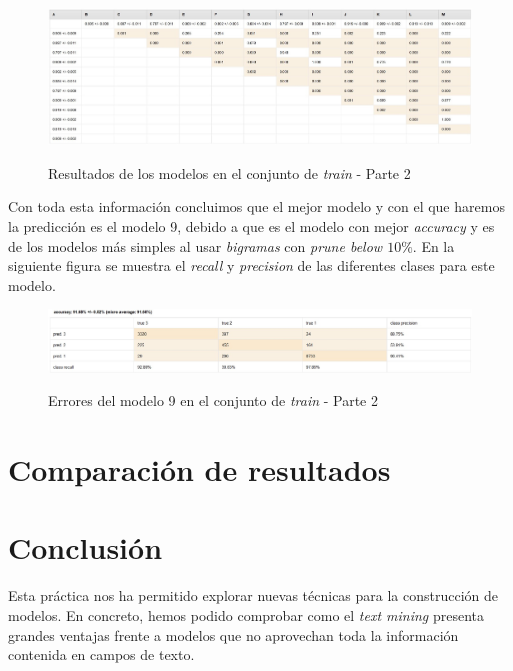 \documentclass[12pt]{report} %
\begin{document}
    \begin{figure}[H]
        \includegraphics[width=\linewidth]{t_test2.jpg}\\ 
        \caption{Resultados de los modelos en el conjunto de \textit{train} - Parte 2}
    \end{figure}

    Con toda esta información concluimos que el mejor modelo y con el que haremos
    la predicción es el modelo 9, debido a que es el modelo con mejor
    \textit{accuracy} y es de los modelos más simples al usar \textit{bigramas}
    con \textit{prune below $10\%$}. En la siguiente figura se muestra el 
    \textit{recall} y \textit{precision} de las diferentes clases para este modelo.

    \begin{figure}[H]
        \includegraphics[width=\linewidth]{train2.jpeg}\\ 
        \caption{Errores del modelo 9 en el conjunto de \textit{train} - Parte 2}
    \end{figure}

\chapter{Comparación de resultados}
\label{chap:resultados}

\chapter{Conclusión}
\label{chap:conclusion}

Esta práctica nos ha permitido explorar nuevas técnicas para la construcción de modelos. En concreto, hemos podido comprobar como el \textit{text mining} presenta grandes ventajas frente a modelos que no aprovechan toda la información contenida en campos de texto.
\end{document}
